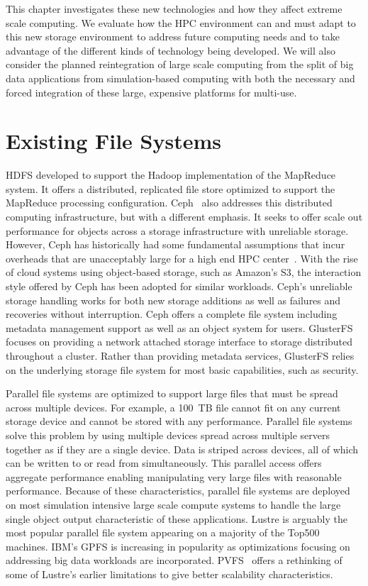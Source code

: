 This chapter investigates these new technologies and how they affect extreme
scale computing. We evaluate how the HPC environment can and must adapt to this
new storage environment to address future computing needs and to take advantage
of the different kinds of technology being developed. We will also consider the
planned reintegration of large scale computing from the split of big data
applications from simulation-based computing with both the necessary and forced
integration of these large, expensive platforms for multi-use.

\section{Existing File Systems}

HDFS developed to support the Hadoop implementation of the MapReduce system. It
offers a distributed, replicated file store optimized to support the MapReduce
processing configuration. Ceph~\cite{weil:2006:ceph} also addresses this
distributed computing infrastructure, but with a different emphasis. It seeks
to offer scale out performance for objects across a storage infrastructure
with unreliable storage.  However, Ceph has historically had some fundamental
assumptions that incur overheads that are unacceptably large for a high end HPC
center~\cite{wang:2013:ceph}.  With the rise of cloud systems using
object-based storage, such as Amazon's S3, the interaction style offered by
Ceph has been adopted for similar workloads. Ceph's unreliable storage handling
works for both new storage additions as well as failures and recoveries without
interruption. Ceph offers a complete file system including metadata management
support as well as an object system for users.
GlusterFS~\cite{boyer:2012:glusterfs} focuses on providing a network attached
storage interface to storage distributed throughout a cluster.  Rather than
providing metadata services, GlusterFS relies on the underlying storage file
system for most basic capabilities, such as security.

Parallel file systems are optimized to support large files that must be spread
across multiple devices. For example, a 100~TB file cannot fit on any current
storage device and cannot be stored with any performance. Parallel file systems
solve this problem by using multiple devices spread across multiple servers
together as if they are a single device. Data is striped across devices, all of
which can be written to or read from simultaneously. This parallel access
offers aggregate performance enabling manipulating very large files with
reasonable performance. Because of these characteristics, parallel file systems
are deployed on most simulation intensive large scale compute systems to handle
the large single object output characteristic of these applications.  Lustre is
arguably the most popular parallel file system appearing on a majority of the
Top500 machines. IBM's GPFS is increasing in popularity as optimizations
focusing on addressing big data workloads are incorporated.
PVFS~\cite{ross:2006:pvfs} offers a rethinking of some of Lustre's earlier
limitations to give better scalability characteristics.

